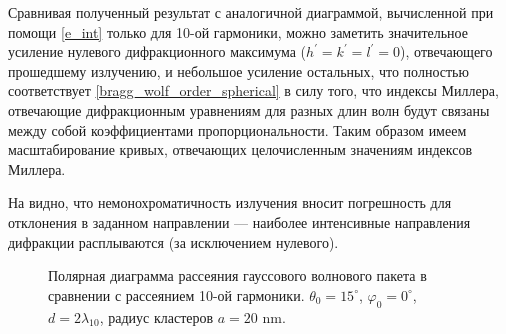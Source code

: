Сравнивая полученный результат с аналогичной диаграммой, вычисленной при помощи \autoref{e_int} только для 10-ой гармоники, можно заметить значительное усиление нулевого дифракционного максимума ($h^\prime = k^\prime = l^\prime = 0$), отвечающего прошедшему излучению, и небольшое усиление остальных, что полностью соответствует \autoref{bragg_wolf_order_spherical} в силу того, что индексы Миллера, отвечающие дифракционным уравнениям для разных длин волн будут связаны между собой коэффициентами пропорциональности. Таким образом имеем масштабирование кривых, отвечающих целочисленным значениям индексов Миллера.

На  видно, что немонохроматичность излучения вносит погрешность для отклонения в заданном направлении --- наиболее интенсивные направления дифракции расплываются (за исключением нулевого).


    \begin{figure}[ht]
        \hfil
        \caption{Полярная диаграмма рассеяния гауссового волнового пакета в сравнении с рассеянием 10-ой гармоники. $\theta_0 = 15^\circ$, $\varphi_0 = 0^\circ$, $d = 2\lambda_{10}$, радиус кластеров $a = 20$ nm.}\label{wavepacket1:image}
    \end{figure}